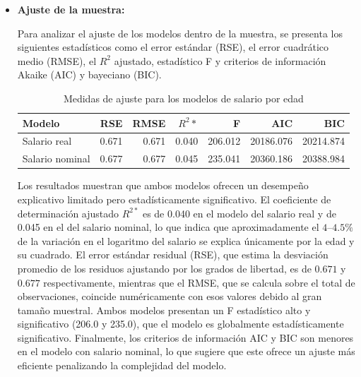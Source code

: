 \documentclass[12pt,a4paper,onecolumn]{article}
\begin{document}
\begin{itemize}
El coeficiente constante para ambos modelos es positivo y significativo, y representa el valor del logaritmo del salario cuando la edad es cero. Aunque este valor no tiene una interpretación económica directa, no se trabaja con 0 años, por lo que es el término que ajusta  el  modelo para la relación entre edad y salario dentro del rango de edades observado en la muestra. 

\item \textbf{Ajuste de la muestra:}

Para analizar el ajuste de los modelos dentro de la muestra, se presenta los siguientes estadísticos como el error estándar  (RSE),  el error cuadrático medio (RMSE), el $R^2$ ajustado, estadístico F y criterios de información Akaike (AIC) y bayeciano (BIC).

\begin{table}[ht]
\centering
\label{3_estad_ajuste}
\begin{tabular}{lrrrrrr}
  \hline
Modelo & RSE & RMSE & $R^2*$ & F & AIC & BIC \\ 
  \hline
Salario real & 0.671 & 0.671 & 0.040 & 206.012 & 20186.076 & 20214.874 \\ 
 Salario nominal & 0.677 & 0.677 & 0.045 & 235.041 & 20360.186 & 20388.984 \\ 
   \hline
\end{tabular}
\caption{Medidas de ajuste para los modelos de salario por edad} 
\end{table}

Los resultados muestran que ambos modelos ofrecen un desempeño explicativo limitado pero estadísticamente significativo. El coeficiente de determinación ajustado $R^{2*}$ es de 0.040 en el modelo del salario real y de 0.045 en el del salario nominal, lo que indica que aproximadamente el $4$–$4.5\%$ de la variación en el logaritmo del salario se explica únicamente por la edad y su cuadrado. El error estándar residual (RSE), que estima la desviación promedio de los residuos ajustando por los grados de libertad, es de $0.671$ y $0.677$ respectivamente, mientras que el RMSE, que se calcula sobre el total de observaciones, coincide numéricamente con esos valores debido al gran tamaño muestral. Ambos modelos presentan un F estadístico alto y significativo (206.0 y 235.0), que el modelo es globalmente estadísticamente significativo. Finalmente, los criterios de información AIC y BIC son menores en el modelo con salario nominal, lo que sugiere que este ofrece un ajuste más eficiente penalizando la complejidad del modelo.


\end{itemize}
\end{document}
